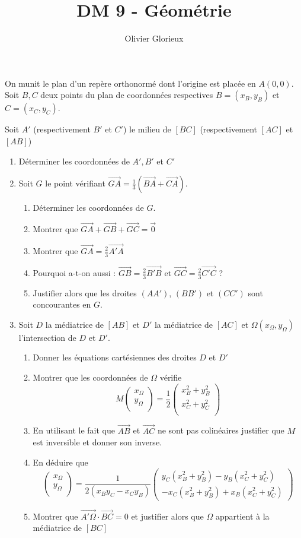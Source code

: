 \documentclass[a4paper, 11pt,reqno]{article}
\author{Olivier Glorieux}
\newcommand\vv[1]{\overrightarrow{#1}}
\begin{document}
\title{DM 9 - Géométrie 
}
\begin{exercice}%
On munit le plan d’un repère orthonormé dont l’origine est placée en $A(0, 0).$
Soit $B, C$ deux points du plan de coordonnées respectives 
$B=(x_B,y_B)$ et $C=(x_C,y_C)$.

Soit $A'$ (respectivement $B'$ et $C'$) le milieu de $[BC]$ (respectivement $[AC]$ et $[AB]$)
\begin{enumerate}
\item Déterminer  les coordonnées de $A', B' $ et $C'$
\item Soit $G$ le point vérifiant $\vv{GA} = \frac{1}{3} (\vv{BA} +\vv{CA})$. 
\begin{enumerate}
\item Déterminer les coordonnées de $G$. 
\item Montrer que $\vv{GA}+\vv{GB}+\vv{GC}=\vv{0}$
\item Montrer que $\vv{GA} =\frac{2}{3}\vv{A'A}$
\item Pourquoi a-t-on aussi :  $\vv{GB} =\frac{2}{3}\vv{B'B}$ et  $\vv{GC} =\frac{2}{3}\vv{C'C}$ ?
\item Justifier alors que les droites $(AA')$, $(BB')$ et $(CC')$ sont concourantes en $G$. 
\end{enumerate}
\item Soit $D$ la médiatrice de $[AB]$ et $D'$ la médiatrice de $[AC]$ et $\Omega(x_\Omega,y_\Omega)$ l'intersection de $D$ et $D'$. 
\begin{enumerate}
\item Donner les équations cartésiennes des droites $D$ et $D'$ 
\item Montrer que les coordonnées de $\Omega$ vérifie 
$$M \begin{pmatrix}
x_\Omega\\
y_\Omega\\
\end{pmatrix}= \frac{1}{2}\begin{pmatrix}
x_B^2+y_B^2\\
x_C^2+y_C^2\\
\end{pmatrix}$$
\item En utilisant le fait que $\vv{AB}$ et $\vv{AC}$ ne sont pas colinéaires justifier que $M$ est inversible et donner son inverse. 
\item En déduire que 
$$ \begin{pmatrix}
x_\Omega\\
y_\Omega\\
\end{pmatrix} = \frac{1}{2\left(x_B y_C-x_C y_B\right)}\left(\begin{array}{c}
y_C\left(x_B^2+y_B^2\right)-y_B\left(x_C^2+y_C^2\right) \\
-x_C\left(x_B^2+y_B^2\right)+x_B\left(x_C^2+y_C^2\right)
\end{array}\right)$$
\item Montrer que $\vv{A' \Omega}\cdot \vv{BC}=0$ et justifier alors que 
$\Omega $ appartient à la médiatrice de $[BC]$
\end{enumerate}


\end{enumerate}
\end{exercice}
\end{document}
